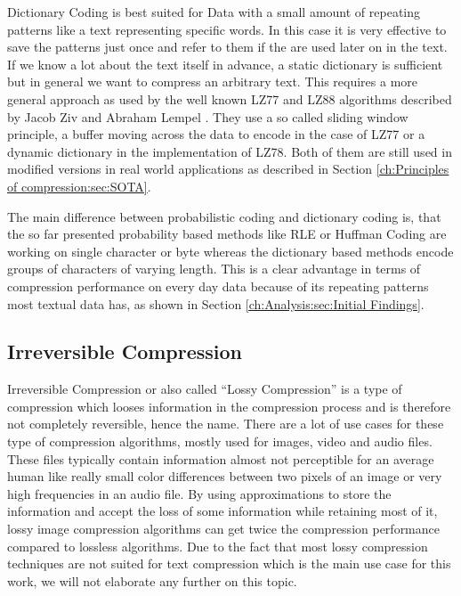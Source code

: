 \par{
Dictionary Coding is best suited for Data with a small amount of repeating patterns like a text representing specific words. In this case it is very effective to save the patterns just once and refer to them if the are used later on in the text. If we know a lot about the text itself in advance, a static dictionary is sufficient but in general we want to compress an arbitrary text. This requires a more general approach as used by the well known LZ77 and LZ88 algorithms described by Jacob Ziv and Abraham Lempel \cite{lz}. They use a so called sliding window principle, a buffer moving across the data to encode in the case of LZ77 or a dynamic dictionary in the implementation of LZ78. Both of them are still used in modified versions in real world applications as described in Section \ref{ch:Principles of compression:sec:SOTA}.
}
\par{
The main difference between probabilistic coding and dictionary coding is, that the so far presented probability based methods like RLE or Huffman Coding are working on single character or byte whereas the dictionary based methods encode groups of characters of varying length. This is a clear advantage in terms of compression performance on every day data because of its repeating patterns most textual data has, as shown in Section \ref{ch:Analysis:sec:Initial Findings}.
}


\subsection{Irreversible Compression}
\par{
Irreversible Compression or also called \enquote{Lossy Compression} is a type of compression which looses information in the compression process and is therefore not completely reversible, hence the name. There are a lot of use cases for these type of compression algorithms, mostly used for images, video and audio files. These files typically contain information almost not perceptible for an average human like really small color differences between two pixels of an image or very high frequencies in an audio file. By using approximations to store the information and accept the loss of some information while retaining most of it, lossy image compression algorithms can get twice the compression performance compared to lossless algorithms. Due to the fact that most lossy compression techniques are not suited for text compression which is the main use case for this work, we will not elaborate any further on this topic.
}


